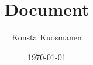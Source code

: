 \documentclass[11pt,a4paper]{article}
\title{Document}
\author{Konsta Kuosmanen}
\date{\today}
\begin{document}
\maketitle

\pagebreak

\tableofcontents

\pagebreak

\end{document}
